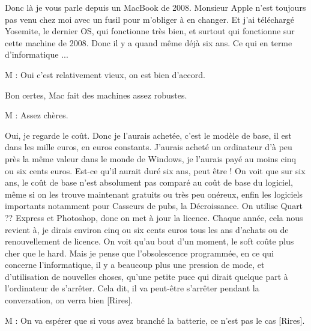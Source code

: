 \begin{description}
Donc là je vous parle depuis un MacBook de 2008. Monsieur Apple n'est toujours pas venu chez moi avec un fusil pour m'obliger à en changer. Et j'ai téléchargé Yosemite, le dernier OS, qui fonctionne très bien, et surtout qui fonctionne sur cette machine de 2008. Donc il y a quand même déjà six ans. Ce qui en terme d'informatique ...

\vspace{1\baselineskip}

M : Oui c'est relativement vieux, on est bien d'accord.

\vspace{1\baselineskip}

Bon certes, Mac fait des machines assez robustes.

\vspace{1\baselineskip}

M : Assez chères.

\vspace{1\baselineskip}

Oui, je regarde le coût. Donc je l'aurais achetée, c'est le modèle de base, il est dans les mille euros, en euros constants. J'aurais acheté un ordinateur d'à peu près la même valeur dans le monde de Windows, je l'aurais payé au moins cinq ou six cents euros. Est-ce qu'il aurait duré six ans, peut être ! On voit que sur six ans, le coût de base n'est absolument pas comparé au coût de base du logiciel, même si on les trouve maintenant gratuits ou très peu onéreux, enfin les logiciels importants notamment pour Casseurs de pubs, la Décroissance. On utilise Quart ?? Express et Photoshop, donc on met à jour la licence. Chaque année, cela nous revient à, je dirais environ cinq ou six cents euros tous les ans d'achats ou de renouvellement de licence. On voit qu'au bout d'un moment, le soft coûte plus cher que le hard. Mais je pense que l'obsolescence programmée, en ce qui concerne l'informatique, il y a beaucoup plus une pression de mode, et d'utilisation de nouvelles choses, qu'une petite puce qui dirait quelque part à l'ordinateur de s'arrêter. Cela dit, il va peut-être s'arrêter pendant la conversation, on verra bien [Rires].

\vspace{1\baselineskip}

M : On va espérer que si vous avez branché la batterie, ce n'est pas le cas [Rires].

\vspace{1\baselineskip}


\end{description}

